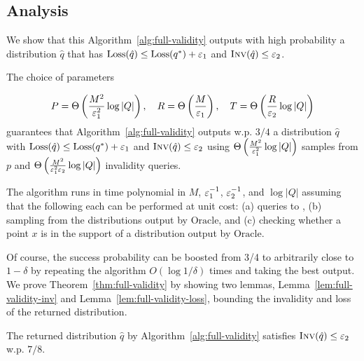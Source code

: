 \subsection{Analysis}

We show that this Algorithm~\ref{alg:full-validity} outputs with high probability a distribution $\hat q$ that has $\text{Loss}(\hat q) \le \text{Loss}(q^*) + \varepsilon_1$ and $\textsc{Inv}(\hat q) \le \varepsilon_2$. 

\begin{theorem}\label{thm:full-validity}
  The choice of parameters
  
  \begin{equation}
    P=\Theta\left(\frac{M^2}{\varepsilon_1^2} \log |Q| \right), \quad R = \Theta \left( \frac { M } {\varepsilon_1} \right), \quad  T = \Theta\left(\frac{R}{\varepsilon_2} \log |Q| \right)
    \end{equation}
  guarantees that Algorithm~\ref{alg:full-validity} outputs w.p. $3/4$ a distribution $\hat q$ with $\text{Loss}(\hat q) \le \text{Loss}(q^*) + \varepsilon_1$ and $\textsc{Inv}(\hat q) \le \varepsilon_2$ using $\Theta\left(\frac{M^2}{\varepsilon_1^2} \log |Q| \right)$ samples from $p$ and $\Theta\left(\frac{M^2}{ \varepsilon_1^2 \varepsilon_2} \log |Q|\right)$ invalidity queries.
  
  The algorithm runs in time polynomial in $M$, $\varepsilon_1^{-1}$, $\varepsilon_2^{-1}$, and $\log |Q|$ assuming that the following each can be  performed at unit cost: (a) queries to , (b) sampling from the distributions output by $\text{Oracle}$, and (c) checking whether a point $x$ is in the support of a distribution output by $\text{Oracle}$.
\end{theorem}

Of course, the success probability can be boosted from 3/4 to arbitrarily close to $1-\delta$ by repeating the algorithm $O(\log 1/\delta)$ times and taking the best output. We prove Theorem~\ref{thm:full-validity} by showing two lemmas, Lemma~\ref{lem:full-validity-inv} and Lemma~\ref{lem:full-validity-loss}, bounding the invalidity and loss of the returned distribution.

\begin{lemma}\label{lem:full-validity-inv}
The returned distribution $\hat q$ by Algorithm~\ref{alg:full-validity} satisfies $\textsc{Inv}(\hat q) \le \varepsilon_2$ w.p. $7/8$.
\end{lemma}

